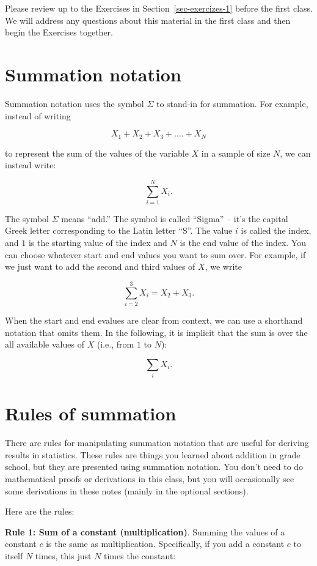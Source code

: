 \documentclass[
  letterpaper,
  DIV=11,
  numbers=noendperiod]{scrreprt}
\begin{document}
Please review up to the Exercises in Section~\ref{sec-exercizes-1}
before the first class. We will address any questions about this
material in the first class and then begin the Exercises together.

\hypertarget{sec-summation-1}{%
\section{Summation notation}\label{sec-summation-1}}

Summation notation uses the symbol \(\Sigma\) to stand-in for summation.
For example, instead of writing

\[ X_1 + X_2 + X_3 + .... + X_N\]

to represent the sum of the values of the variable \(X\) in a sample of
size \(N\), we can instead write:

\[ \sum_{i=1}^{N} X_i. \]

The symbol \(\Sigma\) means ``add.'' The symbol is called ``Sigma'' --
it's the capital Greek letter corresponding to the Latin letter ``S''.
The value \(i\) is called the index, and \(1\) is the starting value of
the index and \(N\) is the end value of the index. You can choose
whatever start and end values you want to sum over. For example, if we
just want to add the second and third values of \(X\), we write

\[ \sum_{i=2}^{3} X_i = X_2 + X_3. \]

When the start and end evalues are clear from context, we can use a
shorthand notation that omits them. In the following, it is implicit
that the sum is over the all available values of \(X\) (i.e., from \(1\)
to \(N\)):

\[ \sum_i X_i. \]

\hypertarget{sec-rules-1}{%
\section{Rules of summation}\label{sec-rules-1}}

There are rules for manipulating summation notation that are useful for
deriving results in statistics. These rules are things you learned about
addition in grade school, but they are presented using summation
notation. You don't need to do mathematical proofs or derivations in
this class, but you will occasionally see some derivations in these
notes (mainly in the optional sections).

Here are the rules:

\textbf{Rule 1: Sum of a constant (multiplication)}. Summing the values
of a constant \(c\) is the same as multiplication. Specifically, if you
add a constant \(c\) to itself \(N\) times, this just \(N\) times the
constant:
\end{document}
